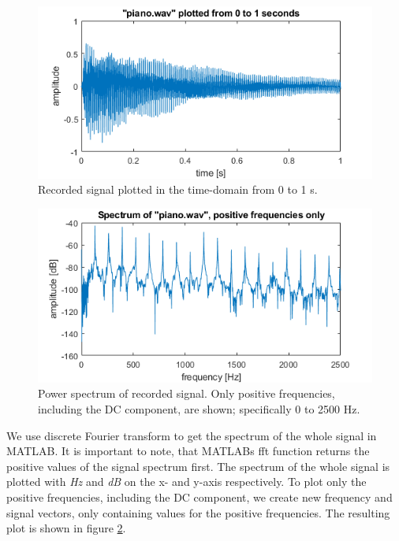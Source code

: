 \documentclass[journal]{IEEEtran}
\begin{document}
\begin{figure} [h]
    \centering
    \includegraphics[width=\linewidth]{assignment_01/plots/time_plot.png}
    \caption{Recorded signal plotted in the time-domain from 0 to 1 s.}
    \label{fig:time}
\end{figure}
\begin{figure} [h]
    \centering
    \includegraphics[width=\linewidth]{assignment_01/plots/freq_plot.png}
    \caption{Power spectrum of recorded signal. Only positive frequencies, including the DC component, are shown; specifically 0 to 2500 Hz.}
    \label{fig:freq}
\end{figure}

We use discrete Fourier transform to get the spectrum of the whole signal in MATLAB. It is important to note, that MATLABs fft function returns the positive values of the signal spectrum first. The spectrum of the whole signal is plotted with \textit{Hz} and \textit{dB} on the x- and y-axis respectively. %
To plot only the positive frequencies, including the DC component, we create new frequency and signal vectors, only containing values for the positive frequencies. The resulting plot is shown in figure \ref{fig:freq}.
\end{document}
